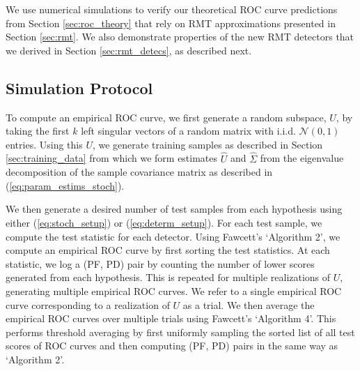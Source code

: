 We use numerical simulations to verify our theoretical ROC curve predictions from Section \ref{sec:roc_theory} that rely on RMT approximations presented in Section \ref{sec:rmt}. We also demonstrate properties of the new RMT detectors that we derived in Section \ref{sec:rmt_detecs}, as described next.


\subsection{Simulation Protocol}\label{sec:sim_proto}

To compute an empirical ROC curve, we first generate a random subspace, $U$, by taking the first $k$ left singular vectors of a random matrix with i.i.d. $\mathcal{N}(0,1)$ entries. Using this $U$, we generate training samples as described in Section \ref{sec:training_data} from which we form estimates $\widehat{U}$ and $\widehat{\Sigma}$ from the eigenvalue decomposition of the sample covariance matrix as described in (\ref{eq:param_estims_stoch}).

We then generate a desired number of test samples from each hypothesis using either (\ref{eq:stoch_setup}) or (\ref{eq:determ_setup}). For each test sample, we compute the test statistic for each detector. Using Fawcett's \cite{fawcett2006introduction} `Algorithm 2', we compute an empirical ROC curve by first sorting the test statistics. At each statistic, we log a (PF, PD) pair by counting the number of lower scores generated from each hypothesis. This is repeated for multiple realizations of $U$, generating multiple empirical ROC curves. We refer to a single empirical ROC curve corresponding to a realization of $U$ as a trial. We then average the empirical ROC curves over multiple trials using Fawcett's \cite{fawcett2006introduction} `Algorithm 4'. This performs threshold averaging by first uniformly sampling the sorted list of all test scores of ROC curves and then computing (PF, PD) pairs in the same way as `Algorithm 2'.


